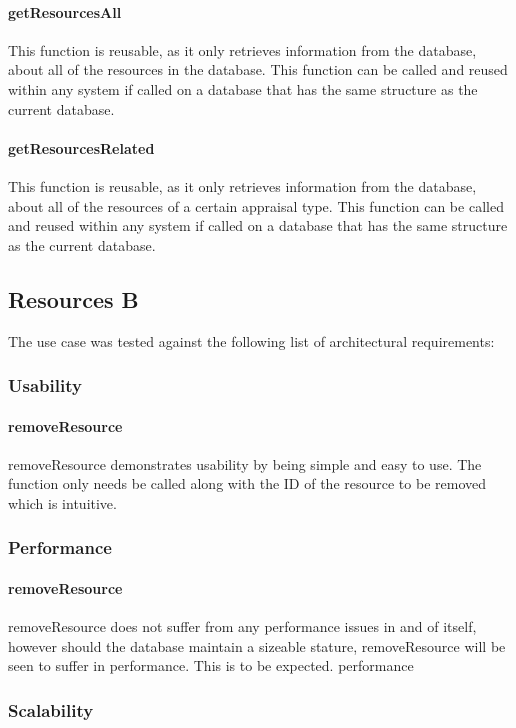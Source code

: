 \documentclass[a4paper]{article}
\begin{document}
\paragraph{getResourcesAll}
This function is reusable, as it only retrieves information from the database, about all of the resources in the database. This function can be called and reused within any system if called on a database that has the same structure as the current database.

\paragraph{getResourcesRelated}
This function is reusable, as it only retrieves information from the database, about all of the resources of a certain appraisal type. This function can be called and reused within any system if called on a database that has the same structure as the current database.


\subsection {Resources B}
The use case was tested against the following list of architectural requirements:
\subsubsection {Usability}

\paragraph{removeResource}
removeResource demonstrates usability by being simple and easy to use. The function only needs be called along with the ID of the resource to be removed which is intuitive.

\subsubsection {Performance}

\paragraph{removeResource}
removeResource does not suffer from any performance issues in and of itself, however should the database maintain a sizeable stature, removeResource will be seen to suffer in performance. This is to be expected.
performance


\subsubsection {Scalability}
\end{document}
